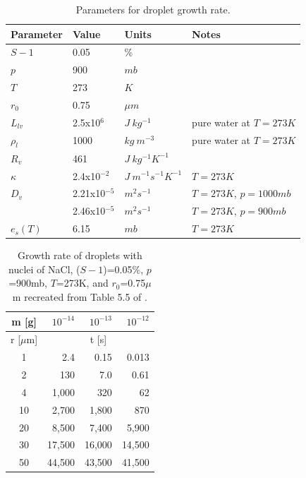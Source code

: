 \documentclass[titlepage]{article}
\newcommand{\ra}[1]{\renewcommand{\arraystretch}{#1}}
\begin{document}
\begin{table}[h]
    \centering
    \caption{Parameters for droplet growth rate.}
    \label{tab:parameters}

    \begin{tabular}{l l l l}
    \toprule
    Parameter & Value & Units & Notes\\
    \midrule
    $S - 1$   & 0.05            & \%                         & \\
    $p$       & 900             & $mb$                       & \\
    $T$       & 273             & $K$                        & \\
    $r_0$     & 0.75            & $\mu m$                    & \\
    $L_{lv}$  & 2.5x10$^{6}$    & $J \ kg^{-1}$              & pure water at $T=273 K$ \\
    $\rho_l$  & 1000            & $kg \ m^{-3}$              & pure water at $T=273 K$ \\
    $R_v$     & 461             & $J \ kg^{-1} K^{-1}$       & \\
    $\kappa$  & 2.4x10$^{-2}$   & $J \ m^{-1} s^{-1} K^{-1}$ & $T=273 K$ \\
    $D_v$     & 2.21x10$^{-5}$  & $m^2 s^{-1}$               & $T=273 K$, $p=1000 mb$ \\
              & 2.46x10$^{-5}$  & $m^2 s^{-1}$               & $T=273 K$, $p=900 mb$ \\
    $e_s (T)$ & 6.15            & $mb$                       & $T=273 K$\\
    \bottomrule
    \end{tabular}
\end{table}


\begin{table}[h]
    \centering
    \caption{Growth rate of droplets with nuclei of NaCl, ($S - 1$)=0.05\%,
        $p$=900mb, $T$=273K, and $r_0$=0.75$\mu$m recreated from Table 5.5 of \cite{Curry}.}
    \label{tab:Table5.5}

    \ra{1.2}
    \begin{tabular}{@{} c r r r @{}}
        \\
        \toprule
        m [g] & $10^{-14}$ & $10^{-13}$ & $10^{-12}$ \\
        \midrule
        r [$\mu$m] & \multicolumn{3}{c}{t [s]} \\
        \midrule
        1  & 2.4    & 0.15   & 0.013 \\
        2  & 130    & 7.0    & 0.61 \\
        4  & 1,000  & 320    & 62 \\
        10 & 2,700  & 1,800  & 870 \\
        20 & 8,500  & 7,400  & 5,900 \\
        30 & 17,500 & 16,000 & 14,500 \\
        50 & 44,500 & 43,500 & 41,500 \\
        \bottomrule
    \end{tabular}
\end{table}
\end{document}
